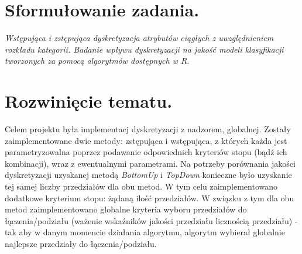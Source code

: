 
\section{Sformułowanie zadania.}
\emph{Wstępująca i zstępująca dyskretyzacja atrybutów ciągłych z uwzględnieniem rozkładu kategorii. Badanie wpływu dyskretyzacji na jakość modeli klasyfikacji tworzonych za pomocą algorytmów dostępnych w R.}

\section{Rozwinięcie tematu.}
Celem projektu była implementacj dyskretyzacji z nadzorem, globalnej. Zostały zaimplementowane dwie metody: zstępująca i wstępująca, z których każda jest parametryzowalna poprzez podawanie odpowiednich kryteriów stopu (bądź ich kombinacji), wraz z ewentualnymi parametrami. Na potrzeby porównania jakości dyskretyzacji uzyskanej metodą \emph{BottomUp} i \emph{TopDown} konieczne było uzyskanie tej samej liczby przedziałów dla obu metod. W tym celu zaimplementowano dodatkowe kryterium stopu: żądaną ilość przedziałów. W związku z tym dla obu metod zaimplementowano globalne kryteria wyboru przedziałów do łączenia/podziału (ważenie wskaźników jakości przedziału licznością przedziału) - tak aby w danym momencie działania algorytmu, algorytm wybierał globalnie najlepsze przedziały do łączenia/podziału.
